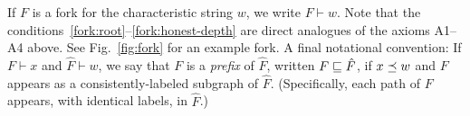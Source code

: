 If $F$ is a fork for the characteristic string $w$, we write
$F\vdash w$.  Note that the
conditions~\ref{fork:root}--\ref{fork:honest-depth} are direct
analogues of the axioms A1--A4 above. See Fig.~\ref{fig:fork} for an
example fork. A final notational convention: If $F \vdash x$ and
$\hat{F} \vdash w$, we say that $F$ is a \emph{prefix} of $\hat{F}$,
written $F \sqsubseteq \hat{F}$, if 
$x \preceq w$
and $F$ appears as a
consistently-labeled subgraph of $\hat{F}$. 
(Specifically, each path of $F$ appears, with identical labels, in $\hat{F}$.) 



